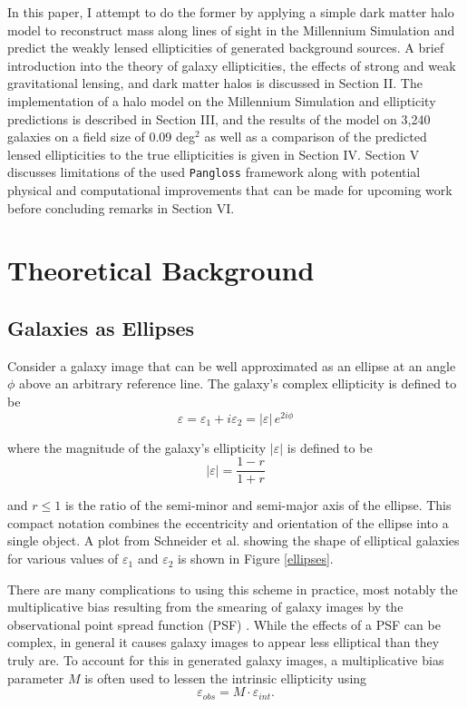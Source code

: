 \documentclass[%
 reprint,
 amsmath,amssymb,
 aps,nofootinbib
]{revtex4-1}
\begin{document}
In this paper, I attempt to do the former by applying a simple dark matter halo model to reconstruct mass along lines of sight in the Millennium Simulation and predict the weakly lensed ellipticities of generated background sources. A brief introduction into the theory of galaxy ellipticities, the effects of strong and weak gravitational lensing, and dark matter halos is discussed in Section II. The implementation of a halo model on the Millennium Simulation and ellipticity predictions is described in Section III, and the results of the model on 3,240 galaxies on a field size of 0.09 deg$^2$ as well as a comparison of the predicted lensed ellipticities to the true ellipticities is given in Section IV.  Section V discusses limitations of the used \texttt{Pangloss} framework along with potential physical and computational improvements that can be made for upcoming work before concluding remarks in Section VI.

\section{Theoretical Background}

\subsection*{Galaxies as Ellipses}
Consider a galaxy image that can be well approximated as an ellipse at an angle $\phi$ above an arbitrary reference line. The galaxy's complex ellipticity is defined to be 
\begin{equation}\label{complex_ellipticity}
\varepsilon=\varepsilon_1+i\varepsilon_2=|\varepsilon|\,e^{2i\phi}
\end{equation}

\noindent where the magnitude of the galaxy's ellipticity $|\varepsilon|$ is defined to be
\begin{equation}
|\varepsilon|=\frac{1-r}{1+r}
\end{equation}

\noindent and $r\leq1$ is the ratio of the semi-minor and semi-major axis of the ellipse. This compact notation combines the eccentricity and orientation of the ellipse into a single object. A plot from Schneider et al. \cite{schneider} showing the shape of elliptical galaxies for various values of $\varepsilon_1$ and $\varepsilon_2$ is shown in Figure \ref{ellipses}.

There are many complications to using this scheme in practice, most notably the multiplicative bias resulting from the smearing of galaxy images by the observational point spread function (PSF) \cite{multiplicative_bias}. While the effects of a PSF can be complex, in general it causes galaxy images to appear less elliptical than they truly are. To account for this in generated galaxy images, a multiplicative bias parameter $M$ is often used to lessen the intrinsic ellipticity using
$$\varepsilon_{obs}=M\cdot\varepsilon_{int}.$$
\end{document}

